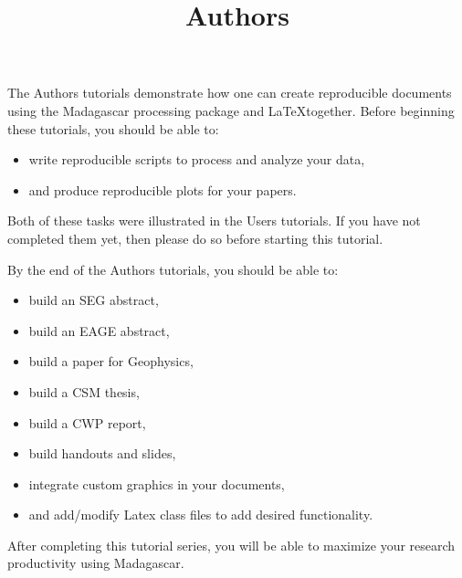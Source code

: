 \title{Authors}
The Authors tutorials demonstrate how one can create reproducible documents using the Madagascar processing package and \LaTeX together.  Before beginning these tutorials, you should be able to:
\begin{itemize}
    \item write reproducible scripts to process and analyze your data,
    \item and produce reproducible plots for your papers.
\end{itemize}
Both of these tasks were illustrated in the Users tutorials.  If you have not completed them yet, then please do so before starting this tutorial.

By the end of the Authors tutorials, you should be able to:
\begin{itemize}
    \item build an SEG abstract,
    \item build an EAGE abstract,
    \item build a paper for Geophysics,
    \item build a CSM thesis,
    \item build a CWP report,
    \item build handouts and slides,
    \item integrate custom graphics in your documents,
    \item and add/modify Latex class files to add desired functionality.
\end{itemize}
After completing this tutorial series, you will be able to maximize your research productivity using Madagascar.








